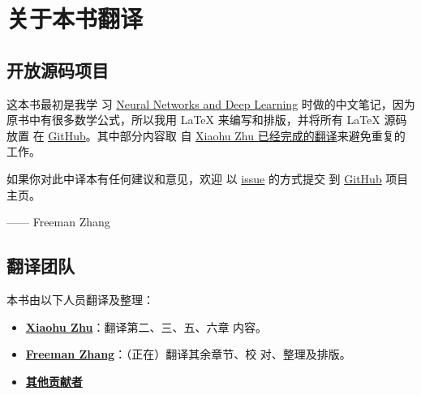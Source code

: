 
\chapter{关于本书翻译}
\label{ch:TranslationTeam}

\section*{开放源码项目}

这本书最初是我学
习 \href{http://neuralnetworksanddeeplearning.com/index.html}{Neural Networks
  and Deep Learning} 时做的中文笔记，因为原书中有很多数学公式，所以我用 \LaTeX{}
来编写和排版，并将所有 \LaTeX{} 源码放置
在 \href{https://github.com/zhanggyb/nndl}{GitHub}。其中部分内容取
自
\href{https://github.com/tigerneil/neural-networks-and-deep-learning-zh-cn}{Xiaohu
  Zhu 已经完成的翻译}来避免重复的工作。

如果你对此中译本有任何建议和意见，欢迎
以 \href{https://github.com/zhanggyb/nndl/issues}{issue} 的方式提交
到 \href{https://github.com/zhanggyb/nndl}{GitHub} 项目主页。

\begin{flushright}
  —— Freeman Zhang
\end{flushright}

\section*{翻译团队}

本书由以下人员翻译及整理：

\begin{itemize}
\item \textbf{\href{mailto:xhzhu.nju@gmail}{Xiaohu Zhu}}：翻译第二、三、五、六章
  内容。
\item \textbf{\href{mailto:zhanggyb@gmail.com}{Freeman Zhang}}：（正在）翻译其余章节、校
  对、整理及排版。
\item \textbf{\href{https://github.com/zhanggyb/nndl/graphs/contributors}{其他贡献者}}
\end{itemize}
